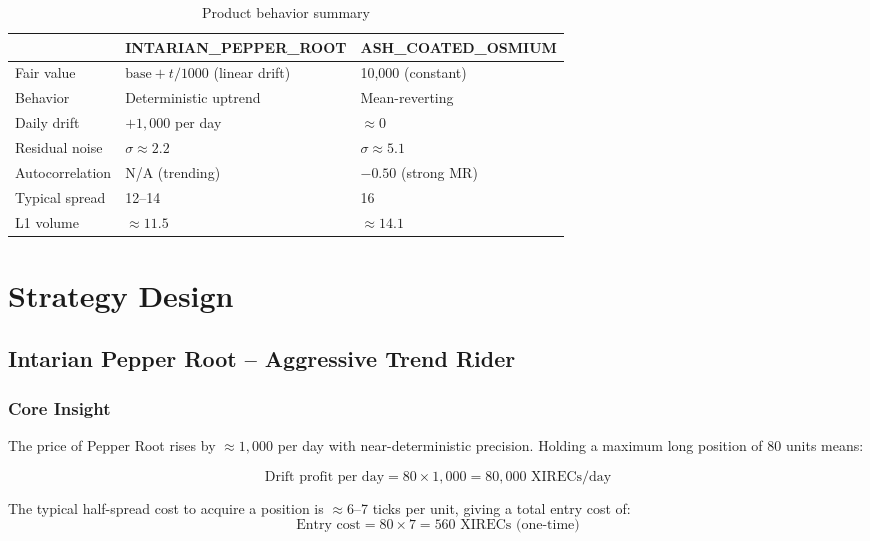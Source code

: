 \documentclass[11pt,a4paper]{article}
\begin{document}
\begin{table}[H]
\centering
\caption{Product behavior summary}
\begin{tabular}{@{}lll@{}}
\toprule
& \textbf{INTARIAN\_PEPPER\_ROOT} & \textbf{ASH\_COATED\_OSMIUM} \\
\midrule
Fair value      & $\text{base} + t / 1000$ (linear drift)  & 10,000 (constant) \\
Behavior        & Deterministic uptrend                     & Mean-reverting \\
Daily drift     & $+1{,}000$ per day                        & $\approx 0$ \\
Residual noise  & $\sigma \approx 2.2$                      & $\sigma \approx 5.1$ \\
Autocorrelation & N/A (trending)                            & $-0.50$ (strong MR) \\
Typical spread  & 12--14                                    & 16 \\
L1 volume       & $\approx 11.5$                            & $\approx 14.1$ \\
\bottomrule
\end{tabular}
\end{table}

\section{Strategy Design}

\subsection{Intarian Pepper Root -- Aggressive Trend Rider}

\subsubsection{Core Insight}

The price of Pepper Root rises by $\approx 1{,}000$ per day with near-deterministic precision. Holding a maximum long position of 80 units means:

\begin{equation}
\text{Drift profit per day} = 80 \times 1{,}000 = \boxed{80{,}000 \text{ XIRECs/day}}
\end{equation}

The typical half-spread cost to acquire a position is $\approx 6$--7 ticks per unit, giving a total entry cost of:
\begin{equation}
\text{Entry cost} = 80 \times 7 = 560 \text{ XIRECs (one-time)}
\end{equation}
\end{document}
